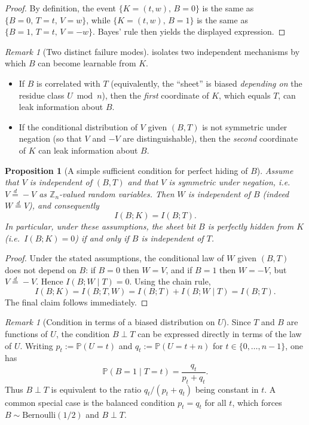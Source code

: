 \documentclass[11pt,a4paper]{article}
\newtheorem{proposition}[theorem]{Proposition}
\theoremstyle{definition}
\theoremstyle{remark}
\newtheorem{remark}[theorem]{Remark}
\begin{document}
\begin{proof}
By definition, the event \(\{K=(t,w),\,B=0\}\) is the same as \(\{B=0,\,T=t,\,V=w\}\), while \(\{K=(t,w),\,B=1\}\) is the same as \(\{B=1,\,T=t,\,V=-w\}\). Bayes' rule then yields the displayed expression.
\end{proof}

\begin{remark}[Two distinct failure modes]
\label{rem:two-failure-modes}
 isolates two independent mechanisms by which \(B\) can become learnable from \(K\).
\begin{itemize}
  \item If \(B\) is correlated with \(T\) (equivalently, the ``sheet'' is biased \emph{depending on} the residue class \(U\bmod n\)), then the \emph{first} coordinate of \(K\), which equals \(T\), can leak information about \(B\).
  \item If the conditional distribution of \(V\) given \((B,T)\) is not symmetric under negation (so that \(V\) and \(-V\) are distinguishable), then the \emph{second} coordinate of \(K\) can leak information about \(B\).
\end{itemize}
\end{remark}

\begin{proposition}[A simple sufficient condition for perfect hiding of \(B\)]
\label{prop:biased-u-sufficient}
Assume that \(V\) is independent of \((B,T)\) and that \(V\) is symmetric under negation, i.e.\ \(V\overset{d}{=}-V\) as \(\mathbb{Z}_n\)-valued random variables. Then \(W\) is independent of \(B\) (indeed \(W\overset{d}{=}V\)), and consequently
\[
I(B;K)=I(B;T).
\]
In particular, under these assumptions, the sheet bit \(B\) is perfectly hidden from \(K\) (i.e.\ \(I(B;K)=0\)) if and only if \(B\) is independent of \(T\).
\end{proposition}

\begin{proof}
Under the stated assumptions, the conditional law of \(W\) given \((B,T)\) does not depend on \(B\): if \(B=0\) then \(W=V\), and if \(B=1\) then \(W=-V\), but \(V\overset{d}{=}-V\). Hence \(I(B;W\mid T)=0\). Using the chain rule,
\[
I(B;K)=I(B;T,W)=I(B;T)+I(B;W\mid T)=I(B;T).
\]
The final claim follows immediately.
\end{proof}

\begin{remark}[Condition in terms of a biased distribution on \(U\)]
\label{rem:condition-on-u}
Since \(T\) and \(B\) are functions of \(U\), the condition \(B\perp T\) can be expressed directly in terms of the law of \(U\). Writing \(p_t:=\mathbb{P}(U=t)\) and \(q_t:=\mathbb{P}(U=t+n)\) for \(t\in\{0,\dots,n-1\}\), one has
\[
\mathbb{P}(B=1\mid T=t)=\frac{q_t}{p_t+q_t}.
\]
Thus \(B\perp T\) is equivalent to the ratio \(q_t/(p_t+q_t)\) being constant in \(t\). A common special case is the balanced condition \(p_t=q_t\) for all \(t\), which forces \(B\sim\mathrm{Bernoulli}(1/2)\) and \(B\perp T\).
\end{remark}
\end{document}

